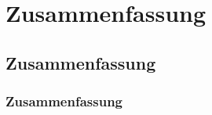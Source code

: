 \section{Zusammenfassung} 
\subsection{Zusammenfassung}

\begin{frame}
  \frametitle{Zusammenfassung}
\end{frame}

